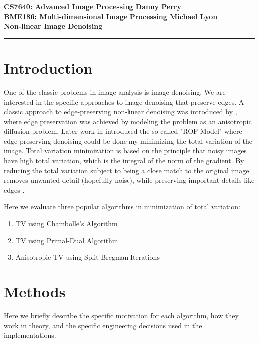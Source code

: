 \documentclass[11pt]{article}
\begin{document}
\thispagestyle{empty}
{\large{\bf CS7640: Advanced Image Processing \hfill Danny Perry}}\\
{\large{\bf BME186: Multi-dimensional Image Processing \hfill Michael Lyon}}\\

{\LARGE{\bf Non-linear Image Denoising}}
\vspace{0.2\baselineskip}
\hrule

\section{Introduction}
One of the classic problems in image analysis is image denoising.
We are interested in the specific approaches to image denoising that preserve edges.
A classic approach to edge-preserving non-linear denoising was introduced by \cite{perona1990scale}, where edge preservation was achieved by modeling the problem as an anisotropic diffusion problem.
Later work in \cite{rudin1992nonlinear} introduced the so called "ROF Model" where edge-preserving denoising could be done my minimizing the total variation of the image.
Total variation minimization is based on the principle that noisy images have high total variation, which is the integral of the norm of the gradient.  
By reducing the total variation subject to being a close match to the original image removes unwanted detail (hopefully noise), while preserving important details like edges \cite{wikiTV}.

Here we evaluate three popular algorithms in minimization of total variation:
\begin{enumerate}
\item TV using Chambolle's Algorithm
\item TV using Primal-Dual Algorithm
\item Anisotropic TV using Split-Bregman Iterations
\end{enumerate}

\section{Methods}
Here we briefly describe the specific motivation for each algorithm, how they work in theory, and the specific engineering decisions used in the implementations.
\end{document}
